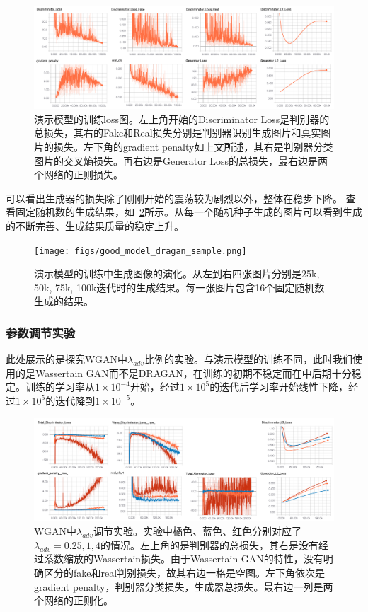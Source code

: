 \documentclass[a4paper,12pt,UTF8]{ctexart}
\newcommand{\kai}{\CJKfamily{zhkai}}	%
\begin{document}
\begin{figure}[H]
  \centering
  \includegraphics[width=1\linewidth]{figs/good_model_dragan.png}
  \caption{\kai 演示模型的训练loss图。左上角开始的Discriminator Loss是判别器的总损失，其右的Fake和Real损失分别是判别器识别生成图片和真实图片的损失。左下角的gradient penalty如上文所述，其右是判别器分类图片的交叉熵损失。再右边是Generator Loss的总损失，最右边是两个网络的正则损失。}
  \label{fig:goodmodel_dragan}
\end{figure}

可以看出生成器的损失除了刚刚开始的震荡较为剧烈以外，整体在稳步下降。
查看固定随机数的生成结果，如~\ref{fig:dragan_evolve}所示。从每一个随机种子生成的图片可以看到生成的不断完善、生成结果质量的稳定上升。

\begin{figure}[H]
  \centering
  \texttt{[image: figs/good\_model\_dragan\_sample.png]}
  \caption{\kai 演示模型的训练中生成图像的演化。从左到右四张图片分别是25k, 50k, 75k, 100k迭代时的生成结果。每一张图片包含16个固定随机数生成的结果。}
  \label{fig:dragan_evolve}
\end{figure}

\subsubsection{参数调节实验}

此处展示的是探究WGAN中$\lambda_{adv}$比例的实验。与演示模型的训练不同，此时我们使用的是Wassertain GAN而不是DRAGAN，在训练的初期不稳定而在中后期十分稳定。训练的学习率从$1 \times 10^{-4}$开始，经过$1 \times 10^{5}$的迭代后学习率开始线性下降，经过$1 \times 10^{5}$的迭代降到$1 \times 10^{-5}$。

\begin{figure}[H]
  \centering
  \includegraphics[width=1\linewidth]{figs/good_model_wgan.png}
  \caption{\kai WGAN中$\lambda_{adv}$调节实验。实验中橘色、蓝色、红色分别对应了$\lambda_{adv}=0.25, 1, 4$的情况。左上角的是判别器的总损失，其右是没有经过系数缩放的Wassertain损失。由于Wassertain GAN的特性，没有明确区分的fake和real判别损失，故其右边一格是空图。左下角依次是gradient penalty，判别器分类损失，生成器总损失。最右边一列是两个网络的正则化。}
  \label{fig:goodmodel_wgan}
\end{figure}
\end{document}
